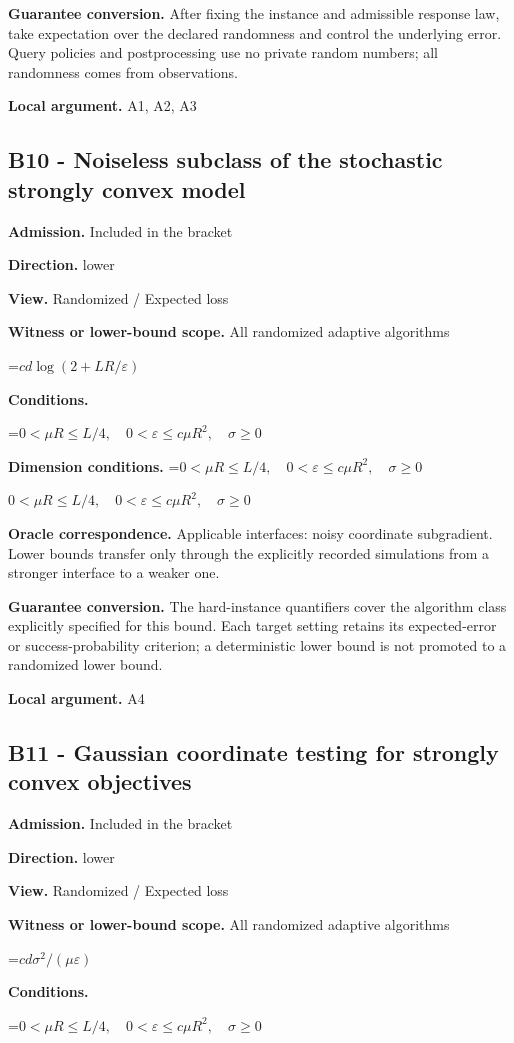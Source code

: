 \documentclass[10pt,a4paper]{article}
\newcommand{\AtlasMath}[1]{\par\begingroup\centering\setbox0=\hbox{$\displaystyle #1$}\ifdim\wd0>1.4\linewidth\typeout{ATLAS WIDE FORMULA: \the\wd0}\fi\ifdim\wd0>\linewidth\resizebox{\linewidth}{!}{\box0}\else\box0\fi\par\endgroup}
\newcommand{\AtlasInlineMath}[1]{\begingroup\setbox0=\hbox{$#1$}\ifdim\wd0>.4\linewidth\endgroup\AtlasMath{#1}\else\endgroup$#1$\fi}
\begin{document}
\textbf{Guarantee conversion.} After fixing the instance and admissible response law, take expectation over the declared randomness and control the underlying error. Query policies and postprocessing use no private random numbers; all randomness comes from observations.

\textbf{Local argument.} A1, A2, A3

\subsection{B10 - Noiseless subclass of the stochastic strongly convex model}
\textbf{Admission.} Included in the bracket

\textbf{Direction.} lower

\textbf{View.} Randomized / Expected loss

\textbf{Witness or lower-bound scope.} All randomized adaptive algorithms

\AtlasMath{cd\log(2+LR/\varepsilon)}
\textbf{Conditions.} 
\AtlasMath{0<\mu R\le L/4,\quad0<\varepsilon\le c\mu R^2,\quad\sigma\ge0}


\textbf{Dimension conditions.} \AtlasInlineMath{0<\mu R\le L/4,\quad0<\varepsilon\le c\mu R^2,\quad\sigma\ge0}

\textbf{Oracle correspondence.} Applicable interfaces: noisy coordinate subgradient. Lower bounds transfer only through the explicitly recorded simulations from a stronger interface to a weaker one.

\textbf{Guarantee conversion.} The hard-instance quantifiers cover the algorithm class explicitly specified for this bound. Each target setting retains its expected-error or success-probability criterion; a deterministic lower bound is not promoted to a randomized lower bound.

\textbf{Local argument.} A4

\subsection{B11 - Gaussian coordinate testing for strongly convex objectives}
\textbf{Admission.} Included in the bracket

\textbf{Direction.} lower

\textbf{View.} Randomized / Expected loss

\textbf{Witness or lower-bound scope.} All randomized adaptive algorithms

\AtlasMath{cd\sigma^2/(\mu\varepsilon)}
\textbf{Conditions.} 
\AtlasMath{0<\mu R\le L/4,\quad0<\varepsilon\le c\mu R^2,\quad\sigma\ge0}
\end{document}
